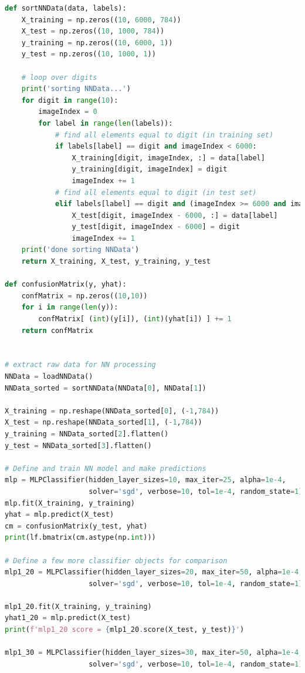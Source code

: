\documentclass[11pt,a4paper]{article}
\begin{document}
\begin{lstlisting}[language=Python]
def sortNNData(data, labels):
    X_training = np.zeros((10, 6000, 784))
    X_test = np.zeros((10, 1000, 784))
    y_training = np.zeros((10, 6000, 1))
    y_test = np.zeros((10, 1000, 1))

    # loop over digits
    print('sorting NNData...')
    for digit in range(10):
        imageIndex = 0
        for label in range(len(labels)):
            # find all elements equal to digit (in training set)
            if labels[label] == digit and imageIndex < 6000:
                X_training[digit, imageIndex, :] = data[label]
                y_training[digit, imageIndex] = digit
                imageIndex += 1
            # find all elements equal to digit (in test set)
            elif labels[label] == digit and (imageIndex >= 6000 and imageIndex < 7000):
                X_test[digit, imageIndex - 6000, :] = data[label]
                y_test[digit, imageIndex - 6000] = digit
                imageIndex += 1
    print('done sorting NNData')
    return X_training, X_test, y_training, y_test

def confusionMatrix(y, yhat):
    confMatrix = np.zeros((10,10))
    for i in range(len(y)):
        confMatrix[ (int)(y[i]), (int)(yhat[i]) ] += 1
    return confMatrix
            

# extract raw data for NN processing
NNData = loadNNData()
NNData_sorted = sortNNData(NNData[0], NNData[1])

X_training = np.reshape(NNData_sorted[0], (-1,784))
X_test = np.reshape(NNData_sorted[1], (-1,784))
y_training = NNData_sorted[2].flatten()
y_test = NNData_sorted[3].flatten()

# Define and train NN model and make predictions
mlp = MLPClassifier(hidden_layer_sizes=10, max_iter=25, alpha=1e-4,
                    solver='sgd', verbose=10, tol=1e-4, random_state=1)
mlp.fit(X_training, y_training)
yhat = mlp.predict(X_test)
cm = confusionMatrix(y_test, yhat)
print(lf.bmatrix(cm.astype(np.int)))

# Define a few more classifier objects for comparison
mlp1_20 = MLPClassifier(hidden_layer_sizes=20, max_iter=50, alpha=1e-4,
                    solver='sgd', verbose=10, tol=1e-4, random_state=1)

mlp1_20.fit(X_training, y_training)
yhat1_20 = mlp.predict(X_test)
print(f'mlp1_20 score = {mlp1_20.score(X_test, y_test)}')

mlp1_30 = MLPClassifier(hidden_layer_sizes=30, max_iter=50, alpha=1e-4,
                    solver='sgd', verbose=10, tol=1e-4, random_state=1)


\end{lstlisting}
\end{document}

